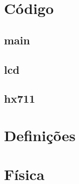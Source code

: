 \chapter{Código}
\section{main}

\section{lcd}


\section{hx711}


\chapter{Definições}

\label{anexo-definition-1}
\chapter{Física}

\label{anexo-physics-1}

